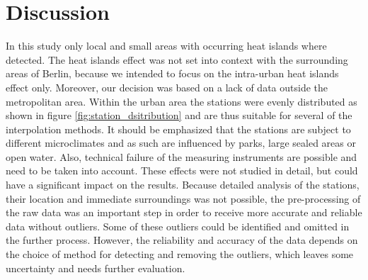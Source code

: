 
\section{Discussion}

In this study only local and small areas with occurring heat islands where detected. The \ldq{}heat islands effect\rdq{} was not set into context with the surrounding areas of Berlin, because we intended to focus on the intra-urban heat islands effect only. Moreover, our decision was based on a lack of data outside the metropolitan area. Within the urban area the stations were evenly distributed as shown in figure \ref{fig:station_dsitribution} and are thus suitable for several of the interpolation methods. It should be emphasized that the stations are subject to different microclimates and as such are influenced by parks, large sealed areas or open water. \cite{chowienczyk_estimating_2020} Also, technical failure of the measuring instruments are possible and need to be taken into account. These effects were not studied in detail, but could have a significant impact on the results. Because detailed analysis of the stations, their location and immediate surroundings was not possible, the pre-processing of the raw data was an important step in order to receive more accurate and reliable data without outliers. Some of these outliers could be identified and omitted in the further process. However, the reliability and accuracy of the data depends on the choice of method for detecting and removing the outliers, which leaves some uncertainty and needs further evaluation. 

